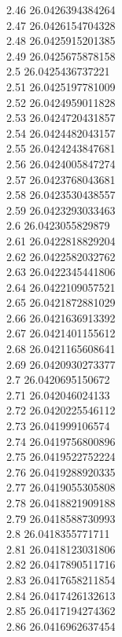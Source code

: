 {2.46	26.0426394384264\\
2.47	26.0426154704328\\
2.48	26.0425915201385\\
2.49	26.0425675878158\\
2.5	26.0425436737221\\
2.51	26.0425197781009\\
2.52	26.0424959011828\\
2.53	26.0424720431857\\
2.54	26.0424482043157\\
2.55	26.0424243847681\\
2.56	26.0424005847274\\
2.57	26.0423768043681\\
2.58	26.0423530438557\\
2.59	26.0423293033463\\
2.6	26.0423055829879\\
2.61	26.0422818829204\\
2.62	26.0422582032762\\
2.63	26.0422345441806\\
2.64	26.0422109057521\\
2.65	26.0421872881029\\
2.66	26.0421636913392\\
2.67	26.0421401155612\\
2.68	26.0421165608641\\
2.69	26.0420930273377\\
2.7	26.0420695150672\\
2.71	26.042046024133\\
2.72	26.0420225546112\\
2.73	26.041999106574\\
2.74	26.0419756800896\\
2.75	26.0419522752224\\
2.76	26.0419288920335\\
2.77	26.0419055305808\\
2.78	26.0418821909188\\
2.79	26.0418588730993\\
2.8	26.0418355771711\\
2.81	26.0418123031806\\
2.82	26.0417890511716\\
2.83	26.0417658211854\\
2.84	26.0417426132613\\
2.85	26.0417194274362\\
2.86	26.0416962637454\\
}
